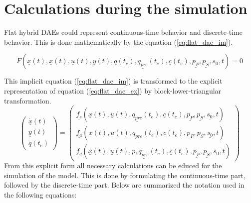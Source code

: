 

\appendix
\section{Calculations during the simulation}\label{app:calculations}

Flat hybrid DAEs could represent continuous-time behavior and
discrete-time behavior. This is done mathematically by the equation
(\ref{eq:flat_dae_im}).

\begin{equation}\label{eq:flat_dae_im}
  F(  \underline{\dot x}(t),
  \underline{x}(t),
  \underline{u}(t),
  \underline{y}(t),
  \underline{q}(t_e),
  \underline{q_{pre}}(t_e),
  \underline{c}(t_e),
  \underline{p_{P}},
  \underline{p_{S}},
  \underline{s_0},
  t) = 0
\end{equation}

This implicit equation (\ref{eq:flat_dae_im}) is transformed to the explicit
representation of equation (\ref{eq:flat_dae_ex}) by block-lower-triangular
transformation.
\begin{equation}\label{eq:flat_dae_ex}
     \left(  \begin{array}{c}
         \underline{\dot x}(t) \\
         \underline{y}(t) \\
         \underline{q}(t_e)
       \end{array} \right) =
      \left( \begin{array}{c}
      \underline{f_s}(\underline{x}(t),
        \underline{u}(t),
        \underline{q_{pre}}(t_e),
        \underline{c}(t_e),
        \underline{p_{P}},
        \underline{p_{S}},
        \underline{s_0},
        t) \\
      \underline{f_a}(\underline{x}(t),
        \underline{u}(t),
        \underline{q_{pre}}(t_e),
        \underline{c}(t_e),
        \underline{p_{P}},
        \underline{p_{S}},
        \underline{s_0},
        t) \\
      \underline{f_q}(\underline{x}(t),
        \underline{u}(t),
        \underline{p},
        \underline{q_{pre}}(t_e),
        \underline{c}(t_e),
        \underline{p_{P}},
        \underline{p_{S}},
        \underline{s_0},
        t)
      \end{array} \right)
\end{equation}
From this explicit form all necessary calculations can be educed for the
simulation of the model. This is done by formulating the
continuous-time part, followed by the discrete-time part. Below are
summarized the notation used in the following equations:


